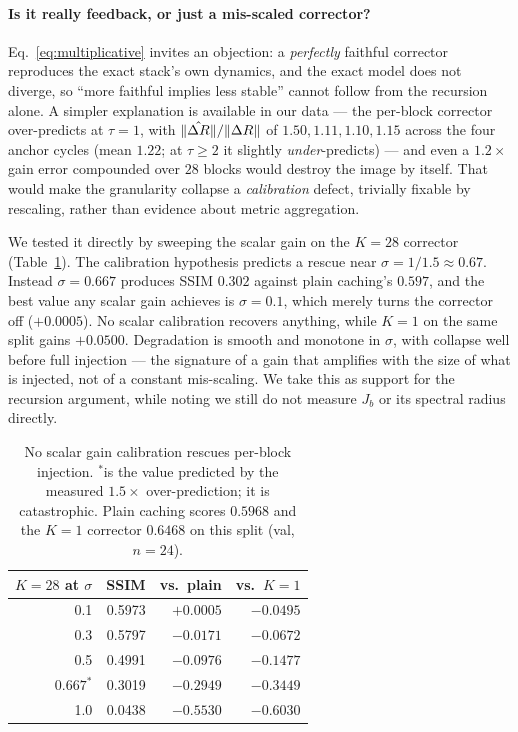 \paragraph{Is it really feedback, or just a mis-scaled corrector?} Eq.~\ref{eq:multiplicative}
invites an objection: a \emph{perfectly} faithful corrector reproduces the exact
stack's own dynamics, and the exact model does not diverge, so ``more faithful implies
less stable'' cannot follow from the recursion alone. A simpler explanation is
available in our data --- the per-block corrector over-predicts at $\tau{=}1$, with
$\lVert\hat{\Delta R}\rVert/\lVert\Delta R\rVert$ of $1.50, 1.11, 1.10, 1.15$ across the four
anchor cycles (mean $1.22$; at $\tau\ge2$ it slightly \emph{under}-predicts) --- and
even a $1.2\times$ gain error compounded over $28$ blocks would destroy the image by
itself. That would
make the granularity collapse a \emph{calibration} defect, trivially fixable by
rescaling, rather than evidence about metric aggregation.

We tested it directly by sweeping the scalar gain on the $K{=}28$ corrector
(Table~\ref{tab:calib}). The calibration hypothesis predicts a rescue near
$\sigma = 1/1.5 \approx 0.67$. Instead $\sigma{=}0.667$ produces SSIM $0.302$ against
plain caching's $0.597$, and the best value any scalar gain achieves is $\sigma{=}0.1$,
which merely turns the corrector off ($+0.0005$). No scalar calibration recovers
anything, while $K{=}1$ on the same split gains $+0.0500$. Degradation is smooth and
monotone in $\sigma$, with collapse well before full injection --- the signature of a
gain that amplifies with the size of what is injected, not of a constant mis-scaling.
We take this as support for the recursion argument, while noting we still do not
measure $J_b$ or its spectral radius directly.

\begin{table}[t]
\centering\small
\begin{tabular}{rrrr}
\toprule
$K{=}28$ at $\sigma$ & SSIM & vs.\ plain & vs.\ $K{=}1$ \\
\midrule
0.1   & 0.5973 & $+0.0005$ & $-0.0495$ \\
0.3   & 0.5797 & $-0.0171$ & $-0.0672$ \\
0.5   & 0.4991 & $-0.0976$ & $-0.1477$ \\
$0.667^{\ast}$ & 0.3019 & $-0.2949$ & $-0.3449$ \\
1.0   & 0.0438 & $-0.5530$ & $-0.6030$ \\
\bottomrule
\end{tabular}
\caption{No scalar gain calibration rescues per-block injection. $^{\ast}$is the value
predicted by the measured $1.5\times$ over-prediction; it is catastrophic. Plain
caching scores $0.5968$ and the $K{=}1$ corrector $0.6468$ on this split
(val, $n{=}24$).}
\label{tab:calib}
\end{table}

